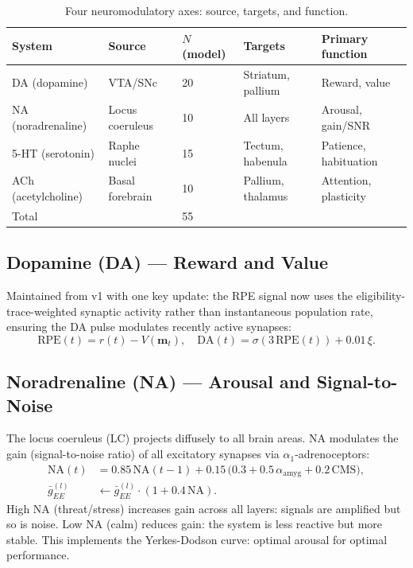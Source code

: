 \documentclass[11pt,a4paper]{article}
\begin{document}
\begin{table}[H]
\centering
\caption{Four neuromodulatory axes: source, targets, and function.}
\label{tab:neuromod}
\begin{tabular}{lllll}
\toprule
System & Source & $N$ (model) & Targets & Primary function \\
\midrule
DA (dopamine)       & VTA/SNc       & 20 & Striatum, pallium & Reward, value \\
NA (noradrenaline)  & Locus coeruleus & 10 & All layers & Arousal, gain/SNR \\
5-HT (serotonin)    & Raphe nuclei  & 15 & Tectum, habenula & Patience, habituation \\
ACh (acetylcholine) & Basal forebrain & 10 & Pallium, thalamus & Attention, plasticity \\
\midrule
Total & & 55 & & \\
\bottomrule
\end{tabular}
\end{table}

\subsection{Dopamine (DA) --- Reward and Value}

Maintained from v1 with one key update: the RPE signal now uses the
eligibility-trace-weighted synaptic activity rather than instantaneous
population rate, ensuring the DA pulse modulates recently active synapses:
\begin{equation}\label{eq:da_v2}
  \text{RPE}(t) = r(t) - V(\mathbf{m}_t),
  \quad
  \text{DA}(t) = \sigma(3\,\text{RPE}(t)) + 0.01\,\xi.
\end{equation}

\subsection{Noradrenaline (NA) --- Arousal and Signal-to-Noise}

The locus coeruleus (LC) projects diffusely to all brain areas.
NA modulates the gain (signal-to-noise ratio) of all excitatory synapses
via $\alpha_1$-adrenoceptors:
\begin{equation}\label{eq:na}
\begin{aligned}
  \text{NA}(t) &= 0.85\,\text{NA}(t{-}1) + 0.15\,\bigl(0.3 + 0.5\,\alpha_\text{amyg}
    + 0.2\,\text{CMS}\bigr), \\
  \bar{g}_{EE}^{(l)} &\leftarrow \bar{g}_{EE}^{(l)} \cdot (1 + 0.4\,\text{NA}).
\end{aligned}
\end{equation}
High NA (threat/stress) increases gain across all layers:
signals are amplified but so is noise.
Low NA (calm) reduces gain: the system is less reactive but more stable.
This implements the Yerkes-Dodson curve: optimal arousal for optimal performance.
\end{document}
